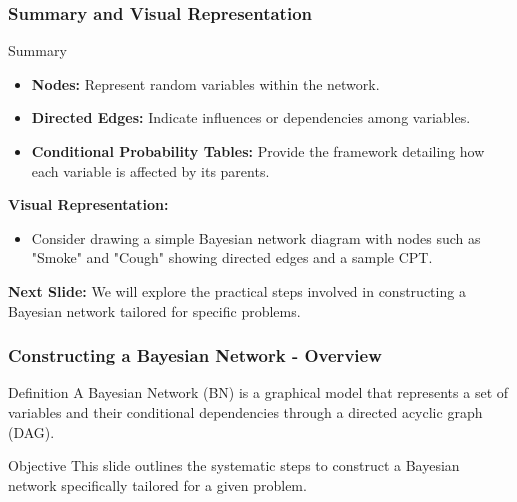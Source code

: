 \documentclass[aspectratio=169]{beamer}
\begin{document}
\begin{frame}[fragile]
    \frametitle{Summary and Visual Representation}
    \begin{block}{Summary}
        \begin{itemize}
            \item \textbf{Nodes:} Represent random variables within the network.
            \item \textbf{Directed Edges:} Indicate influences or dependencies among variables.
            \item \textbf{Conditional Probability Tables:} Provide the framework detailing how each variable is affected by its parents.
        \end{itemize}
    \end{block}

    \bigskip

    \textbf{Visual Representation:} 
    \begin{itemize}
        \item Consider drawing a simple Bayesian network diagram with nodes such as "Smoke" and "Cough" showing directed edges and a sample CPT.
    \end{itemize}

    \bigskip

    \textbf{Next Slide:} We will explore the practical steps involved in constructing a Bayesian network tailored for specific problems.
\end{frame}

\begin{frame}[fragile]
    \frametitle{Constructing a Bayesian Network - Overview}
    \begin{block}{Definition}
        A Bayesian Network (BN) is a graphical model that represents a set of variables and their conditional dependencies through a directed acyclic graph (DAG). 
    \end{block}
    
    \begin{block}{Objective}
        This slide outlines the systematic steps to construct a Bayesian network specifically tailored for a given problem.
    \end{block}
\end{frame}
\end{document}
